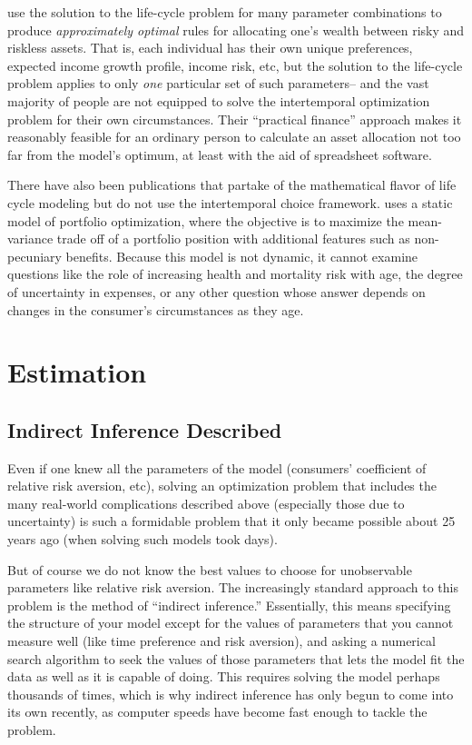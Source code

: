 \documentclass[12pt,letterpaper, fleqn]{article}
\begin{document}
\cite{Choi2025} use the solution to the life-cycle problem for many parameter combinations to produce \textit{approximately optimal} rules for allocating one's wealth between risky and riskless assets.
That is, each individual has their own unique preferences, expected income growth profile, income risk, etc, but the solution to the life-cycle problem applies to only \textit{one} particular set of such parameters-- and the vast majority of people are not equipped to solve the intertemporal optimization problem for their own circumstances.
Their ``practical finance'' approach makes it reasonably feasible for an ordinary person to calculate an asset allocation not too far from the model's optimum, at least with the aid of spreadsheet software.

There have also been publications that partake of the mathematical flavor of life cycle modeling but do not use the intertemporal choice framework.
\cite{Idzorek_2023} uses a static model of portfolio optimization, where the objective is to maximize the mean-variance trade off of a portfolio position with additional features such as non-pecuniary benefits.
Because this model is not dynamic, it cannot examine questions like the role of increasing health and mortality risk with age, the degree of uncertainty in expenses, or any other question whose answer depends on changes in the consumer's circumstances as they age.

\section{Estimation}\label{estimation}

\subsection{Indirect Inference Described}

Even if one knew all the parameters of the model (consumers' coefficient of relative risk aversion, etc), solving an optimization problem that includes the many real-world complications described above (especially those due to uncertainty) is such a formidable problem that it only became possible about 25 years ago (when solving such models took days).

But of course we do not know the best values to choose for unobservable parameters like relative risk aversion.
The increasingly standard approach to this problem is the method of ``indirect inference.''
Essentially, this means specifying the structure of your model except for the values of parameters that you cannot measure well (like time preference and risk aversion), and asking a numerical search algorithm to seek the values of those parameters that lets the model fit the data as well as it is capable of doing.
This requires solving the model perhaps thousands of times, which is why indirect inference has only begun to come into its own recently, as computer speeds have become fast enough to tackle the problem.
\end{document}
